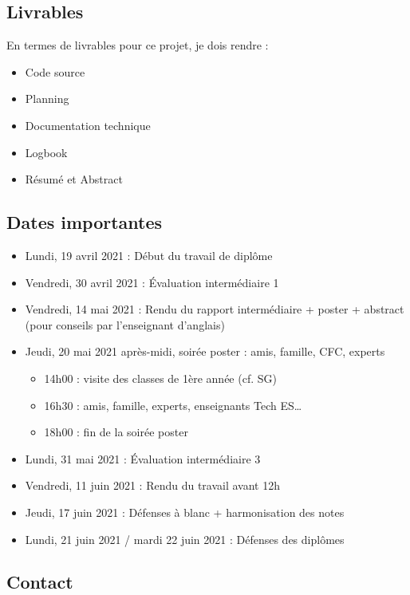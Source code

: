 \documentclass[a4paper,14pt]{extarticle}
\begin{document}
{\subsection{Livrables}
En termes de livrables pour ce projet, je dois rendre :
\begin{itemize}
    \item Code source
    \item Planning
    \item Documentation technique
    \item Logbook
    \item Résumé et Abstract
\end{itemize}

\newpage

\subsection{Dates importantes}

\begin{itemize}
    \item Lundi, 19 avril 2021 : Début du travail de diplôme
    \item Vendredi, 30 avril 2021 : Évaluation intermédiaire 1
    \item Vendredi, 14 mai 2021 : Rendu du rapport intermédiaire + poster + abstract (pour conseils par l’enseignant d’anglais)
    \item Jeudi, 20 mai 2021 après-midi, soirée poster : amis, famille, CFC, experts
    \begin{itemize}
        \item 14h00 : visite des classes de 1ère année (cf. SG)
        \item 16h30 : amis, famille, experts, enseignants Tech ES…
        \item 18h00 : fin de la soirée poster
    \end{itemize}	
    \item Lundi, 31 mai 2021 : Évaluation intermédiaire 3
    \item Vendredi, 11 juin 2021 : Rendu du travail avant 12h
    \item Jeudi, 17 juin 2021 : Défenses à blanc + harmonisation des notes
    \item Lundi, 21 juin 2021 / mardi 22 juin 2021 : Défenses des diplômes

\end{itemize}

\subsection{Contact}

}
\end{document}
